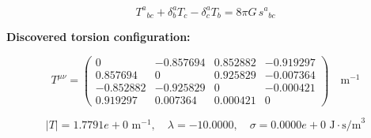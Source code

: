 
\begin{equation}
  T^a{}_{bc} + \delta^a_b T_c - \delta^a_c T_b = 8\pi G \, s^a{}_{bc}
\end{equation}

\textbf{Discovered torsion configuration:}

\begin{equation}
  T^{\mu\nu} = \begin{pmatrix}
    0 & -0.857694 & 0.852882 & -0.919297 \\
    0.857694 & 0 & 0.925829 & -0.007364 \\
    -0.852882 & -0.925829 & 0 & -0.000421 \\
    0.919297 & 0.007364 & 0.000421 & 0
  \end{pmatrix} \quad \text{m}^{-1}
\end{equation}

\begin{equation}
  |T| = 1.7791e+0 \text{ m}^{-1}, \quad
  \lambda = -10.0000, \quad
  \sigma = 0.0000e+0 \text{ J}\cdot\text{s/m}^3
\end{equation}
